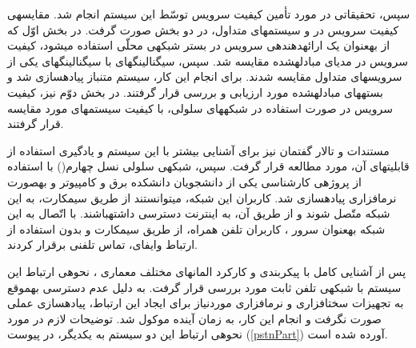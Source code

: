 سپس، تحقیقاتی در مورد تأمین کیفیت سرویس توسّط این سیستم انجام شد. مقایسه\nf ی کیفیت سرویس در  و سیستم\nf های  متداول، در دو بخش صورت گرفت. در بخش اوّل که از  به\nf عنوان یک ارائه\nf دهنده\nf ی سرویس  در بستر شبکه\nf ی محلّی استفاده می\nf شود، کیفیت سرویس در مدیای مبادله\nf شده مقایسه شد. سپس، سیگنالینگ\nf های  با سیگنالینگ\nf های یکی از سرویس\nf های  متداول مقایسه شدند. برای انجام این کار، سیستم  متن\nf باز  پیاده\nf سازی شد و بسته\nf های مبادله\nf شده مورد ارزیابی و بررسی قرار گرفتند. در بخش دوّم نیز، کیفیت سرویس  در صورت استفاده در شبکه\nf های سلولی، با کیفیت سیستم\nf های  مورد مقایسه قرار گرفتند. 

مستندات و تالار گفتمان  نیز برای آشنایی بیشتر با این سیستم و یادگیری استفاده از قابلیت\nf های آن، مورد مطالعه قرار گرفت. سپس، شبکه\nf ی سلولی نسل چهارم() با استفاده از پروژه\nf ی کارشناسی یکی از دانشجویان دانشکده برق و کامپیوتر و به\nf صورت نرم\nf افزاری پیاده\nf سازی شد. کاربران این شبکه، می\nf توانستند از طریق سیم\nf کارت، به این شبکه متّصل شوند و از طریق آن، به اینترنت دسترسی داشته\nf باشند. با اتّصال  به این شبکه به\nf عنوان سرور ، کاربران تلفن همراه، از طریق سیم\nf کارت و بدون استفاده از ارتباط وای\nf فای، تماس تلفنی برقرار کردند.

پس از آشنایی کامل با پیکربندی و کارکرد المان\nf های مختلف معماری ، نحوه\nf ی ارتباط این سیستم با شبکه\nf ی تلفن ثابت مورد بررسی قرار گرفت. به دلیل عدم دسترسی به\nf موقع به تجهیزات سخت\nf افزاری و نرم\nf افزاری موردنیاز برای ایجاد این ارتباط، پیاده\nf سازی عملی صورت نگرفت و انجام این کار، به زمان آینده موکول شد. توضیحات لازم در مورد نحوه\nf ی ارتباط این دو سیستم به یکدیگر، در پیوست (\ref{pstnPart}) آورده شده است.